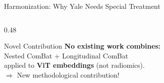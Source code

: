 \documentclass[aspectratio=169,xcolor=dvipsnames]{beamer}
\begin{document}
\begin{frame}{Harmonization: Why Yale Needs Special Treatment}
\begin{columns}
\begin{column}{0.48\textwidth}
            \vspace{0.2em}

            \begin{exampleblock}{\small {} Novel Contribution}
                \scriptsize
                \textbf{No existing work combines:}\\[0.1em]
                Nested ComBat + Longitudinal ComBat\\[0.1em]
                applied to \textbf{ViT embeddings} (not radiomics).\\[0.1em]
                $\Rightarrow$ New methodological contribution!
            \end{exampleblock}
        \end{column}
    \end{columns}
\end{frame}
\end{document}
